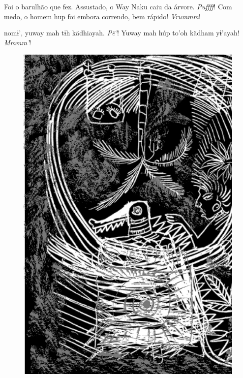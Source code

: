 \chapter*{}

\mbox{}\vspace*{\fill}

 Foi o barulhão
que fez. Assustado,
o Way Naku caiu da
árvore. \textit{Puffff}!
Com medo, o homem
hup foi embora
correndo, bem
rápido! \textit{Vrummm}!

\vspace{2em}

 nomɨ’, yuway
mah tɨh kädhiayah.
\textit{Pë’}! Yuway mah
húp to’oh kädham
yɨ’ayah! \textit{Mmmm’}!

\vspace*{\fill}

\begin{figure}
\vspace*{-2cm}
\hspace*{-2.4cm}\includegraphics[width=142mm]{./imgs/img6.jpg}
\end{figure}

